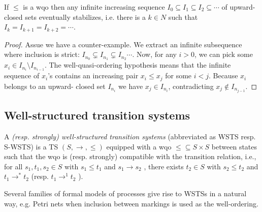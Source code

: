 \begin{lemma}  
If $\leq$ is a wqo then any infinite increasing sequence $I_0 \subseteq I_1 \subseteq I_2 \subseteq \cdots$ of
upward-closed sets eventually stabilizes, i.e. there is a $k \in N$ such that 
$I_k = I_{k+1} = I_{k+2} = \cdots $.
\end{lemma}

\begin{proof}
Assue we have a counter-example.
We extract an infinite subsequence where
inclusion is strict: $I_{n_0} \subsetneq I_{n_1} \subsetneq I_{n_2} \cdots$. Now, for any $i>0$, we can pick some $x_i \in I_{n_i} \setminus I_{n_{i-1}}$. The well-quasi-ordering hypothesis means that the infinite sequence of $x_i$'s
contains an increasing pair $x_i \leq x_j$ for some $i<j$. Because $x_i$ belongs to an upward-
closed set $I_{n_i}$ we have $x_j \in I_{n_i} $, contradicting $x_j \not\in I_{n_{ j - 1}}$.
\end{proof}




\subsection{Well-structured transition systems}


\begin{definition}
A {\em (resp. strongly) well-structured transition systems} (abbreviated as WSTS resp. S-WSTS) 
is a TS
$(S, \rightarrow, \leq)$
equipped with a wqo ${\leq} \subseteq S \times S$ between states such that  
the wqo is (resp. strongly) compatible with the transition relation, i.e., for all 
$s_1, t_1 , s_2 \in S$
	with $s_1 \leq t_1$  and $s_1 \rightarrow s_2$ , there exists 
	$t_2 \in S$ with 
	$s_2 \leq t_2$ and $t_1 \rightarrow^{*} t_2$ 			
				(resp. $t_1 \rightarrow^{1} t_2$ ).
\end{definition}

Several families of formal models of processes give rise to WSTSs in a natural way, e.g. Petri nets when inclusion between markings is used as the well-ordering.



